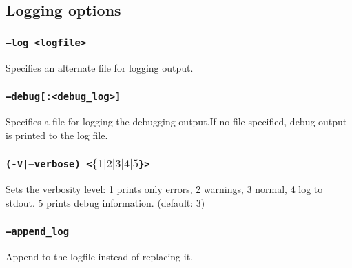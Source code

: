 \subsection{Logging options}

\subsubsection{\texttt{--log <logfile>}}
Specifies an alternate file for logging output.

\subsubsection{\texttt{--debug[:<debug\_log>]}}
Specifies a file for logging the debugging output.If no file
specified, debug output is printed to the log file.

\subsubsection{\texttt{(-V|--verbose) <$\{1|2|3|4|5$\}>}}
Sets the verbosity level:
1 prints only errors, 
2 warnings, 
3 normal, 
4 log to stdout. 
5 prints debug information. 
(default: 3)

\subsubsection{\texttt{--append\_log }}
Append to the logfile instead of replacing it.
